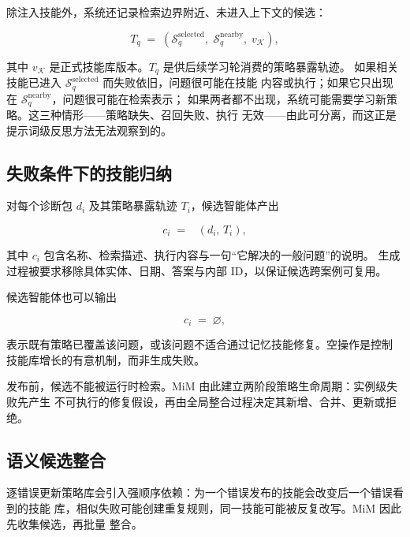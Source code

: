 \documentclass[UTF8,11pt]{ctexart}
\newcommand{\KK}{\mathcal{K}}
\DeclareMathOperator{\Cand}{G_{cand}}
\begin{document}
除注入技能外，系统还记录检索边界附近、未进入上下文的候选：

\begin{equation}
\label{eq:trace}
T_q \;=\; \left(\mathcal{S}_q^{\mathrm{selected}},\; \mathcal{S}_q^{\mathrm{nearby}},\; v_{\KK}\right),
\end{equation}

\noindent 其中 $v_{\KK}$ 是正式技能库版本。$T_q$ 是供后续学习轮消费的策略暴露轨迹。
如果相关技能已进入 $\mathcal{S}_q^{\mathrm{selected}}$ 而失败依旧，问题很可能在技能
内容或执行；如果它只出现在 $\mathcal{S}_q^{\mathrm{nearby}}$，问题很可能在检索表示；
如果两者都不出现，系统可能需要学习新策略。这三种情形——策略缺失、召回失败、执行
无效——由此可分离，而这正是提示词级反思方法无法观察到的。

\subsection{失败条件下的技能归纳}
\label{sec:method-induction}

对每个诊断包 $d_i$ 及其策略暴露轨迹 $T_i$，候选智能体产出

\begin{equation}
\label{eq:candidate}
c_i \;=\; \Cand(d_i,\,T_i),
\end{equation}

\noindent 其中 $c_i$ 包含名称、检索描述、执行内容与一句“它解决的一般问题”的说明。
生成过程被要求移除具体实体、日期、答案与内部 ID，以保证候选跨案例可复用。

候选智能体也可以输出

\begin{equation}
\label{eq:nochange}
c_i \;=\; \varnothing,
\end{equation}

\noindent 表示既有策略已覆盖该问题，或该问题不适合通过记忆技能修复。空操作是控制
技能库增长的有意机制，而非生成失败。

发布前，候选不能被运行时检索。MiM 由此建立两阶段策略生命周期：实例级失败先产生
不可执行的修复假设，再由全局整合过程决定其新增、合并、更新或拒绝。

\subsection{语义候选整合}
\label{sec:method-consolidation}

逐错误更新策略库会引入强顺序依赖：为一个错误发布的技能会改变后一个错误看到的技能
库，相似失败可能创建重复规则，同一技能可能被反复改写。MiM 因此先收集候选，再批量
整合。
\end{document}
